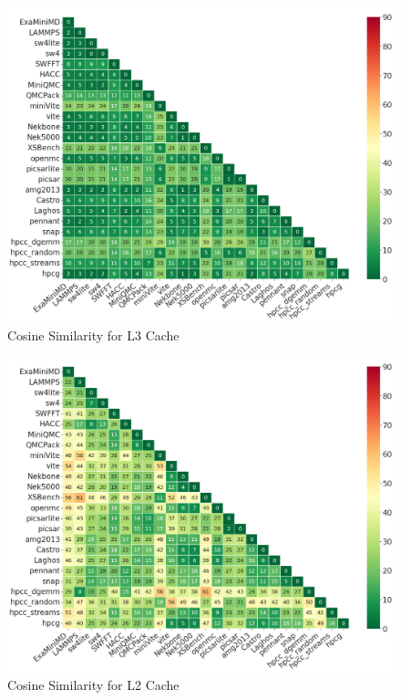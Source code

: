 \begin{figure}[ht]
\centering
\includegraphics[width=0.9\linewidth]{figs/L3_D_Cache.png}
\caption{Cosine Similarity for L3 Cache }
\label{figs:L3_D_Cache}
\end{figure}

\begin{figure}[ht]
\centering
\includegraphics[width=0.9\linewidth]{figs/L2_D_Cache.png}
\caption{Cosine Similarity for L2 Cache }
\label{figs:cosine L2_D_Cache}
\end{figure}



